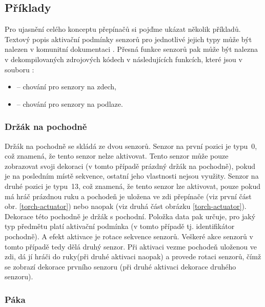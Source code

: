 \subsection{Příklady}
Pro ujasnění celého konceptu přepínačů si pojďme ukázat několik příkladů. Textový popis aktivační podmínky senzorů pro jednotlivé 
jejich typy může být nalezen v komunitní dokumentaci \cite{TechnicalDocumentationFontanel05}. Přesná funkce senzorů pak může být nalezna
v dekompilovaných zdrojových kódech \cite{DMDecompilation} v následujících funkcích, které jsou v souboru :

\begin{itemize}
\item {} -- chování pro senzory na zdech,
\item {} -- chování pro senzory na podlaze.
\end{itemize}

\subsubsection{Držák na pochodně}

Držák na pochodně  se skládá ze dvou senzorů. Senzor na první pozici je typu~0,
což znamená, že tento senzor nelze aktivovat. Tento senzor může pouze zobrazovat svoji dekoraci (v tomto případě prázdný držák na pochodně), pokud je na posledním 
místě sekvence, ostatní jeho vlastnosti nejsou využity. Senzor na druhé pozici je typu~13, což znamená, že tento senzor
lze aktivovat, pouze pokud má hráč prázdnou ruku a pochodeň je uložena ve zdi přepínače (viz první část obr. \ref{torch-actuator}) nebo naopak 
(viz druhá část obrázku \ref{torch-actuator}). Dekorace této pochodně je držák s pochodní. Položka data pak určuje, pro jaký typ předmětu platí
aktivační podmínka (v tomto případě tj. identifikátor pochodně). A efekt aktivace je rotace sekvence senzorů. Veškeré akce senzorů v tomto
případě tedy dělá druhý senzor. Při aktivaci vezme pochodeň uloženou ve zdi, dá jí hráči do ruky(při druhé aktivaci naopak) a provede rotaci senzorů, čímž se zobrazí
dekorace prvního senzoru (při druhé aktivaci dekorace druhého senzoru).


\subsubsection{Páka}

